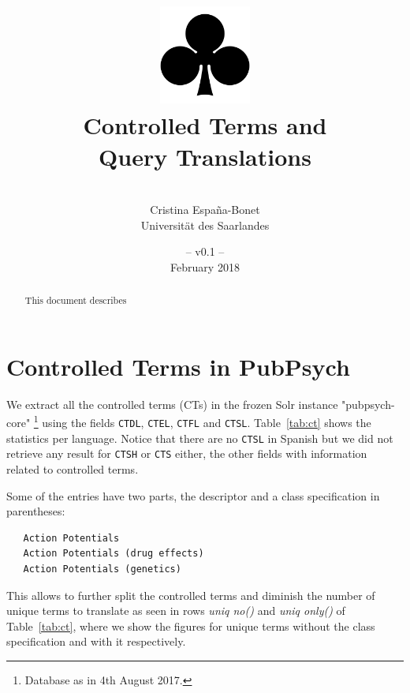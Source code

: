 \documentclass[a4paper,11pt]{article}
\title{
\includegraphics[width=3cm]{./img/200px-SuitClubs.png} \\
\Huge Controlled Terms  and \\ Query Translations \\ 
}
\author{\vspace*{1cm}\\ \LARGE Cristina Espa\~na-Bonet \medskip \\ \Large Universit\"at des Saarlandes}
\date{\vspace*{2cm} -- v0.1 --\\February 2018}
\begin{document}
\clearpage\maketitle
\thispagestyle{empty}

\vspace*{5cm}
\begin{abstract}
This document describes 
\end{abstract}

\newpage
\tableofcontents
\clearpage



\section{Controlled Terms in PubPsych}
\label{s:ct}

We extract all the controlled terms (CTs) in the frozen Solr instance "pubpsych-core"%
\footnote{Database as in 4th August 2017.}  using the fields {\tt CTDL}, {\tt CTEL}, {\tt CTFL} and {\tt CTSL}. Table~\ref{tab:ct} shows the statistics per language. Notice that there are no {\tt CTSL} in Spanish but we did not retrieve any result for {\tt CTSH} or {\tt CTS} either, the other fields with information related to controlled terms.

Some of the entries have two parts, the descriptor and a class specification in parentheses:
{\small 
\begin{verbatim}
   Action Potentials
   Action Potentials (drug effects)
   Action Potentials (genetics)
\end{verbatim}
}

This allows to further split the controlled terms and diminish the number of unique terms to translate as seen in rows \emph{uniq no()} and \emph{uniq only()} of Table~\ref{tab:ct}, where we show the figures for unique terms without the class specification and with it respectively.
\end{document}
